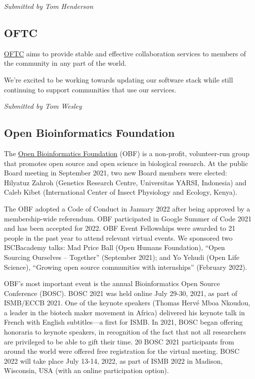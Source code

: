 \documentclass[a4paper]{report}
\begin{document}
{\em Submitted by Tom Henderson}

\subsection{OFTC}

\href{https://oftc.net/}{OFTC} aims to provide stable and effective collaboration services to members of the community in any part of the world.

We're excited to be working towards updating our software stack while still continuing to support communities that use our services.

{\em Submitted by Tom Wesley}

\subsection{Open Bioinformatics Foundation}

The \href{https://www.open-bio.org/}{Open Bioinformatics Foundation} (OBF) is a non-profit, volunteer-run group that promotes open source and open science in biological research. At the public Board meeting in September 2021, two new Board members were elected: Hilyatuz Zahroh (Genetics Research Centre, Universitas YARSI, Indonesia) and Caleb Kibet (International Center of Insect Physiology and Ecology, Kenya).

The OBF adopted a Code of Conduct in January 2022 after being approved by a membership-wide referendum. OBF participated in Google Summer of Code 2021 and has been accepted for 2022.  OBF Event Fellowships were awarded to 21 people in the past year to attend relevant virtual events. We sponsored two ISCBacademy talks: Mad Price Ball (Open Humans Foundation), ``Open Sourcing Ourselves -- Together'' (September 2021); and Yo Yehudi (Open Life Science), ``Growing open source communities with internships'' (February 2022).

OBF's most important event is the annual Bioinformatics Open Source Conference (BOSC). BOSC 2021 was held online July 29-30, 2021, as part of ISMB/ECCB 2021. One of the keynote speakers (Thomas Hervé Mboa Nkoudou, a leader in the biotech maker movement in Africa) delivered his keynote talk in French with English subtitles---a first for ISMB. In 2021, BOSC began offering honoraria to keynote speakers, in recognition of the fact that not all researchers are privileged to be able to gift their time. 20 BOSC 2021 participants from around the world were offered free registration for the virtual meeting. BOSC 2022 will take place July 13-14, 2022, as part of ISMB 2022 in Madison, Wisconsin, USA (with an online participation option).
\end{document}

